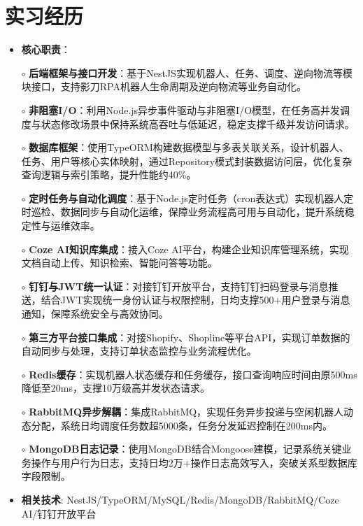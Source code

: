 \section{实习经历}
  \begin{normalsize}
    \begin{itemize}
    \item \textbf{核心职责}：
    \setlength{\itemindent}{1em} %
      \item[$\circ$] \textbf{后端框架与接口开发}：基于NestJS实现机器人、任务、调度、逆向物流等模块接口，支持影刀RPA机器人生命周期及逆向物流等业务自动化。
      \item[$\circ$] \textbf{非阻塞I/O}：利用Node.js异步事件驱动与非阻塞I/O模型，在任务高并发调度与状态修改场景中保持系统高吞吐与低延迟，稳定支撑千级并发访问请求。
      \item[$\circ$] \textbf{数据库框架}：使用TypeORM构建数据模型与多表关联关系，设计机器人、任务、用户等核心实体映射，通过Repository模式封装数据访问层，优化复杂查询逻辑与索引策略，提升性能约40\%。
      \item[$\circ$] \textbf{定时任务与自动化调度}：基于Node.js定时任务（cron表达式）实现机器人定时巡检、数据同步与自动化运维，保障业务流程高可用与自动化，提升系统稳定性与运维效率。
      \item[$\circ$] \textbf{Coze AI知识库集成}：接入Coze AI平台，构建企业知识库管理系统，实现文档自动上传、知识检索、智能问答等功能。
      \item[$\circ$] \textbf{钉钉与JWT统一认证}：对接钉钉开放平台，支持钉钉扫码登录与消息推送，结合JWT实现统一身份认证与权限控制，日均支撑500+用户登录与消息通知，保障系统安全与高效协同。
      \item[$\circ$] \textbf{第三方平台接口集成}：对接Shopify、Shopline等平台API，实现订单数据的自动同步与处理，支持订单状态监控与业务流程优化。
      \item[$\circ$] \textbf{Redis缓存}：实现机器人状态缓存和任务缓存，接口查询响应时间由原500ms降低至20ms，支撑10万级高并发状态请求。
      \item[$\circ$] \textbf{RabbitMQ异步解耦}：集成RabbitMQ，实现任务异步投递与空闲机器人动态分配，系统日均调度任务数超5000条，任务分发延迟控制在200ms内。
      \item[$\circ$] \textbf{MongoDB日志记录}：使用MongoDB结合Mongoose建模，记录系统关键业务操作与用户行为日志，支持日均2万+操作日志高效写入，突破关系型数据库字段限制。
    \setlength{\itemindent}{0em} %
    \item \textbf{相关技术}: NestJS/TypeORM/MySQL/Redis/MongoDB/RabbitMQ/Coze AI/钉钉开放平台
    \end{itemize}
  \end{normalsize}
